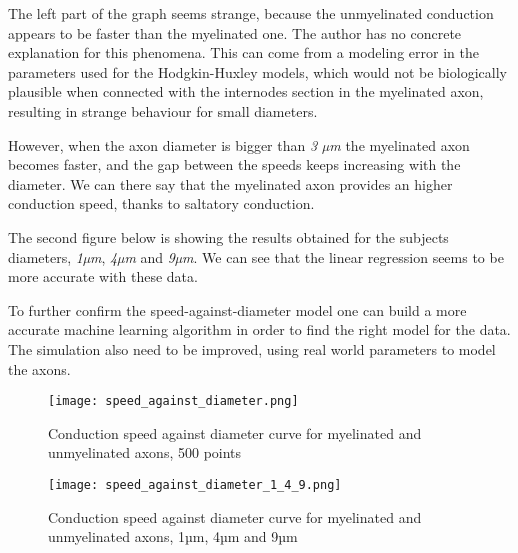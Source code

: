 \documentclass[]{article}
\begin{document}
The left part of the graph seems strange, because the unmyelinated
conduction appears to be faster than the myelinated one. The author has
no concrete explanation for this phenomena. This can come from a
modeling error in the parameters used for the Hodgkin-Huxley models,
which would not be biologically plausible when connected with the
internodes section in the myelinated axon, resulting in strange
behaviour for small diameters.

However, when the axon diameter is bigger than \emph{3 µm} the
myelinated axon becomes faster, and the gap between the speeds keeps
increasing with the diameter. We can there say that the myelinated axon
provides an higher conduction speed, thanks to saltatory conduction.

The second figure below is showing the results obtained for the subjects
diameters, \emph{1µm}, \emph{4µm} and \emph{9µm}. We can see that the
linear regression seems to be more accurate with these data.

To further confirm the speed-against-diameter model one can build a more
accurate machine learning algorithm in order to find the right model for
the data. The simulation also need to be improved, using real world
parameters to model the axons.

\begin{figure}
\centering
\texttt{[image: speed\_against\_diameter.png]}
\caption{Conduction speed against diameter curve for myelinated and
unmyelinated axons, 500 points}
\end{figure}

\begin{figure}
\centering
\texttt{[image: speed\_against\_diameter\_1\_4\_9.png]}
\caption{Conduction speed against diameter curve for myelinated and
unmyelinated axons, 1µm, 4µm and 9µm}
\end{figure}
\end{document}

